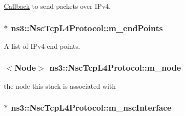 \hyperlink{classns3_1_1Callback}{Callback} to send packets over I\+Pv4. 

\subsubsection[{\texorpdfstring{m\+\_\+end\+Points}{m_endPoints}}]{$\ast$ ns3\+::\+Nsc\+Tcp\+L4\+Protocol\+::m\+\_\+end\+Points\hspace{0.3cm}{\ttfamily [private]}}\hypertarget{classns3_1_1NscTcpL4Protocol_a5cc20dcc5c7877b042c1179f11af6a90}{}\label{classns3_1_1NscTcpL4Protocol_a5cc20dcc5c7877b042c1179f11af6a90}


A list of I\+Pv4 end points. 

\subsubsection[{\texorpdfstring{m\+\_\+node}{m_node}}]{$<${\bf Node}$>$ ns3\+::\+Nsc\+Tcp\+L4\+Protocol\+::m\+\_\+node\hspace{0.3cm}{\ttfamily [private]}}\hypertarget{classns3_1_1NscTcpL4Protocol_a1a7121d0e0f775582e6b01a3e7bc1a6c}{}\label{classns3_1_1NscTcpL4Protocol_a1a7121d0e0f775582e6b01a3e7bc1a6c}


the node this stack is associated with 

\subsubsection[{\texorpdfstring{m\+\_\+nsc\+Interface}{m_nscInterface}}]{$\ast$ ns3\+::\+Nsc\+Tcp\+L4\+Protocol\+::m\+\_\+nsc\+Interface\hspace{0.3cm}{\ttfamily [private]}}\hypertarget{classns3_1_1NscTcpL4Protocol_aa73774a195b1e7d8ca31addef75e3454}{}\label{classns3_1_1NscTcpL4Protocol_aa73774a195b1e7d8ca31addef75e3454}



